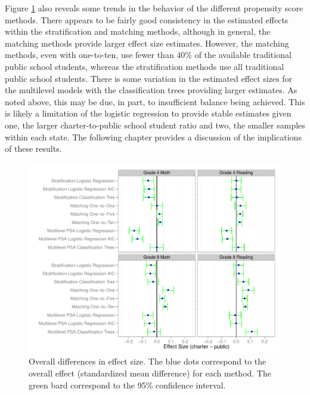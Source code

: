 \documentclass[letterpaper,12pt]{article} %
\begin{document}
Figure \ref{fig:overalldiff} also reveals some trends in the behavior of the different propensity score methods. There appears to be fairly good consistency in the estimated effects within the stratification and matching methods, although in general, the matching methods provide larger effect size estimates. However, the matching methods, even with one-to-ten, use fewer than 40\% of the available traditional public school students, whereas the stratification methods use all traditional public school students. There is some variation in the estimated effect sizes for the multilevel models with the classification trees providing larger estimates. As noted above, this may be due, in part, to insufficient balance being achieved. This is likely a limitation of the logistic regression to provide stable estimates given one, the larger charter-to-public school student ratio and two, the smaller samples within each state. The following chapter provides a discussion of the implications of these results.

\setlength{\belowcaptionskip}{-10pt}
\begin{figure}[t]
\begin{center}
\includegraphics[width=\textwidth]{../Figures2009/Overall.pdf}
\caption[Overall differences in effect size]{Overall differences in effect size. The blue dots correspond to the overall effect (standardized mean difference) for each method. The green bard correspond to the 95\% confidence interval.}
\label{fig:overalldiff}
\end{center}
\end{figure}
\setlength{\belowcaptionskip}{0pt}
\end{document}
